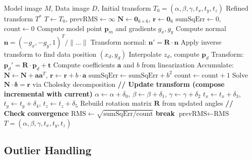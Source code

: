 \documentclass[11pt,a4paper]{article}
\begin{document}
\begin{algorithm}[H]
\caption{6-DOF Point-to-Plane Refinement (Neugebauer)}
\begin{algorithmic}[1]
\Require Model image $M$, Data image $D$, Initial transform $T_0 = (\alpha, \beta, \gamma, t_x, t_y, t_z)$
\Ensure Refined transform $T^*$
\State $T \gets T_0$, $\text{prevRMS} \gets \infty$
    \State $\mathbf{N} \gets \mathbf{0}_{6\times 6}$, $\mathbf{r} \gets \mathbf{0}_6$ 
    \State $\text{sumSqErr} \gets 0$, $\text{count} \gets 0$
        \State Compute model point $\mathbf{p}_m$ and gradients $g_x, g_y$
        \State Compute normal $\mathbf{n} = (-g_x, -g_y, 1)^T / \|...\|$
        \State Transform normal: $\mathbf{n}' = \mathbf{R} \cdot \mathbf{n}$
        \State Apply inverse transform to find data position $(x_d, y_d)$
            \State Interpolate $z_d$, compute $\mathbf{p}_d$
            \State Transform: $\mathbf{p}_d' = \mathbf{R} \cdot \mathbf{p}_d + \mathbf{t}$
            \State Compute coefficients $\mathbf{a}$ and $b$ from linearization
            \State Accumulate: $\mathbf{N} \gets \mathbf{N} + \mathbf{a}\mathbf{a}^T$, $\mathbf{r} \gets \mathbf{r} + b \cdot \mathbf{a}$
            \State $\text{sumSqErr} \gets \text{sumSqErr} + b^2$
            \State $\text{count} \gets \text{count} + 1$
        \EndIf
    \EndFor
    \State
    \State Solve $\mathbf{N} \cdot \boldsymbol{\delta} = \mathbf{r}$ via Cholesky decomposition
    \State
    \State \textbf{// Update transform (compose incremental with current)}
    \State $\alpha \gets \alpha + \delta_0$, $\beta \gets \beta + \delta_1$, $\gamma \gets \gamma + \delta_2$
    \State $t_x \gets t_x + \delta_3$, $t_y \gets t_y + \delta_4$, $t_z \gets t_z + \delta_5$
    \State Rebuild rotation matrix $\mathbf{R}$ from updated angles
    \State
    \State \textbf{// Check convergence}
    \State $\text{RMS} \gets \sqrt{\text{sumSqErr} / \text{count}}$
        \State \textbf{break}
    \EndIf
    \State $\text{prevRMS} \gets \text{RMS}$
\EndFor
\State \Return $T = (\alpha, \beta, \gamma, t_x, t_y, t_z)$
\end{algorithmic}
\end{algorithm}

\subsection{Outlier Handling}
\end{document}
